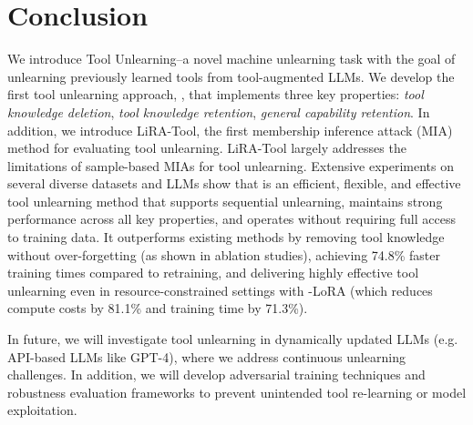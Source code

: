 \section{Conclusion}

We introduce Tool Unlearning--a novel machine unlearning task with the goal of unlearning previously learned tools from tool-augmented LLMs. 
We develop the first tool unlearning approach, \method, that implements three key properties:
{\em tool knowledge deletion}, %
{\em tool knowledge retention}, %
{\em general capability retention}. %
%
In addition, we introduce LiRA-Tool, the first membership inference attack (MIA) method for evaluating tool unlearning. LiRA-Tool largely addresses the limitations of sample-based MIAs for tool unlearning. 
%
Extensive experiments on several diverse datasets and LLMs show  that \method is an efficient, flexible, and effective tool unlearning method that supports sequential unlearning, maintains strong performance across all key properties, and operates without requiring full access to training data. 
It outperforms existing methods by removing tool knowledge without over-forgetting (as shown in ablation studies), achieving 74.8\% faster training times compared to retraining, and delivering highly effective tool unlearning even in resource-constrained settings with \method-LoRA (which reduces compute costs by 81.1\% and training time by 71.3\%). 

In future, we will investigate tool unlearning in dynamically updated LLMs (e.g. API-based LLMs like GPT-4), where we address continuous unlearning challenges. In addition, we will develop adversarial training techniques and robustness evaluation frameworks to prevent unintended tool re-learning or model exploitation.



